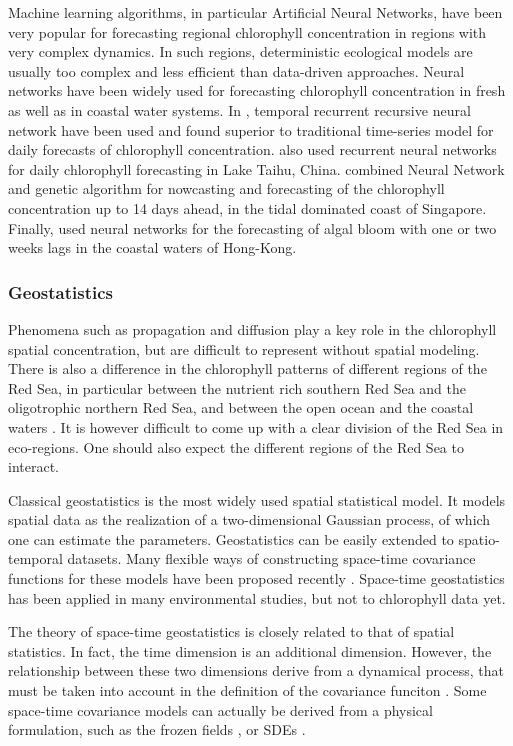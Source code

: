 Machine learning algorithms, in particular Artificial Neural Networks, have been 
very popular for forecasting regional chlorophyll concentration in regions with 
very complex dynamics. In such regions, deterministic ecological models are 
usually too complex and less efficient than data-driven approaches. Neural 
networks have been widely used for forecasting chlorophyll concentration in 
fresh as well as in coastal water systems. In \citet{Jeong2006}, temporal 
recurrent recursive neural network have been used and found superior to 
traditional time-series model for daily forecasts of chlorophyll concentration. 
\citet{Wang2013} also used recurrent neural networks for daily chlorophyll 
forecasting in Lake Taihu, China. \citet{Mulia2013} combined Neural Network and 
genetic algorithm for nowcasting and forecasting of the chlorophyll 
concentration up to 14 days ahead, in the tidal dominated coast of Singapore. 
Finally, \citet{Lee2013} used neural networks for the forecasting of algal bloom 
with one or two weeks lags in the coastal waters of Hong-Kong.

\subsubsection{Geostatistics}

Phenomena such as propagation and diffusion play a key role in the chlorophyll 
spatial concentration, but are difficult to represent without spatial modeling. 
There is also a difference in the chlorophyll patterns of different regions of 
the Red Sea, in particular between the nutrient rich southern Red Sea and the 
oligotrophic northern Red Sea, and between the open ocean and the coastal waters 
\citep{Raitsos2013}. It is however difficult to come up with a clear division of 
the Red Sea in eco-regions. One should also expect the different regions of the 
Red Sea to interact.

Classical geostatistics is the most widely used spatial statistical model. It 
models spatial data as the realization of a two-dimensional Gaussian process, of 
which one can estimate the parameters. Geostatistics can be easily extended to 
spatio-temporal datasets. Many flexible ways of constructing space-time 
covariance functions for these models have been proposed recently 
\citep{Gneiting2002, Cressie1999, Stein2005}. Space-time geostatistics has been 
applied in many environmental studies, but not to chlorophyll data yet.

The theory of space-time geostatistics is closely related to that of spatial 
statistics. In fact, the time dimension is an additional dimension. However, the 
relationship between these two dimensions derive from a dynamical process, that 
must be taken into account in the definition of the covariance funciton 
\citep{Gneiting2010}. Some space-time covariance models can actually be derived 
from a physical formulation, such as the frozen fields \citep{Gneiting2010}, or 
SDEs \citep{Brown2000, North2011}.

